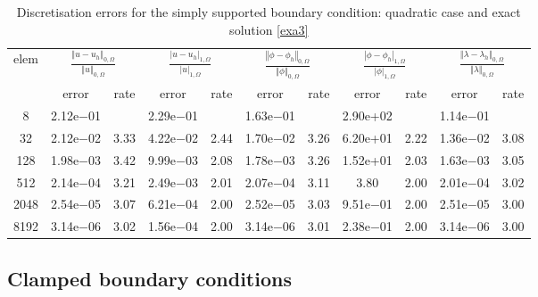 \documentclass[a4paper,final]{siamltex}
\begin{document}
\begin{table}[htb!]
	\centering
	\caption{Discretisation errors  for the simply supported boundary condition: quadratic case and exact solution \eqref{exa3}}
	\begin{tabular}{|c|cc|cc|cc|cc|cc|}
		\hline
		\multirow{2}{*}{elem} & \multicolumn{2}{c|}{$\frac{\left\Vert u - u_h\right\Vert_{0,\Omega}}{\left\Vert u\right\Vert_{0,\Omega}}$} & \multicolumn{2}{c|}{$\frac{| u - u_h|_{1,\Omega}}{|u|_{1,\Omega}}$} & \multicolumn{2}{c|}{$\frac{\left\Vert \phi - \phi_h\right\Vert_{0,\Omega}}{\left\Vert \phi\right\Vert_{0,\Omega}}$} & \multicolumn{2}{c|}{$\frac{|\phi - \phi_h|_{1,\Omega}}{| \phi|_{1,\Omega}}$} & \multicolumn{2}{c|}{$\frac{\left\Vert \lambda - \lambda_h\right\Vert_{0,\Omega}}{\left\Vert \lambda\right\Vert_{0,\Omega}}$}\\ \hhline{~----------}
		& error & rate & error & rate & error & rate & error & rate & error & rate \\\hline
    8 & 2.12e$-$01 &  & 2.29e$-$01 &  & 1.63e$-$01 &  & 2.90e+02 &  & 1.14e$-$01 &  \\\hline
    32 & 2.12e$-$02 & 3.33 & 4.22e$-$02 & 2.44 & 1.70e$-$02 & 3.26 & 6.20e+01 & 2.22 & 1.36e$-$02 & 3.08 \\\hline
    128 & 1.98e$-$03 & 3.42 & 9.99e$-$03 & 2.08 & 1.78e$-$03 & 3.26 & 1.52e+01 & 2.03 & 1.63e$-$03 & 3.05 \\\hline
    512 & 2.14e$-$04 & 3.21 & 2.49e$-$03 & 2.01 & 2.07e$-$04 & 3.11 & 3.80 & 2.00 & 2.01e$-$04 & 3.02 \\\hline
    2048 & 2.54e$-$05 & 3.07 & 6.21e$-$04 & 2.00 & 2.52e$-$05 & 3.03 & 9.51e$-$01 & 2.00 & 2.51e$-$05 & 3.00 \\\hline
    8192 & 3.14e$-$06 & 3.02 & 1.56e$-$04 & 2.00 & 3.14e$-$06 & 3.01 & 2.38e$-$01 & 2.00 & 3.14e$-$06 & 3.00 \\\hline	
	\end{tabular}
	\label{ss3:quadratic}
\end{table}

\subsection{Clamped boundary conditions}
\end{document}

